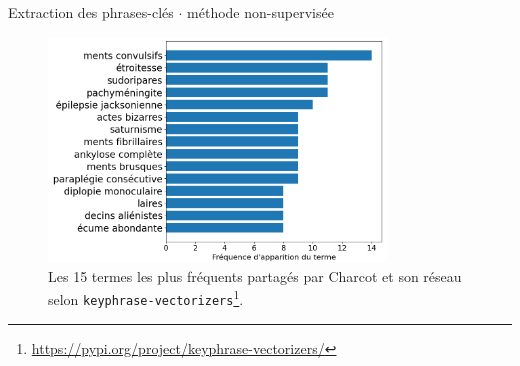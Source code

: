 \begin{frame}{Extraction des phrases-clés $\cdot$ méthode non-supervisée}
		        \begin{figure}[!h]
		\centering
		\includegraphics[width=0.8\textwidth]{pic/termes_partages.png}
		\caption{Les 15 termes les plus fréquents partagés par Charcot et son réseau selon \texttt{keyphrase-vectorizers}\footnote{\url{https://pypi.org/project/keyphrase-vectorizers/}}.}
	\end{figure}
\end{frame}